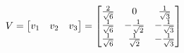 \documentclass[preview]{standalone}
\begin{document}
\begin{align*}
\special{dvisvgm:raw <g id='unique000'>}V = \begin{bmatrix} v_1 & v_2 & v_3 \end{bmatrix} = \begin{bmatrix} \frac{2}{\sqrt{6}} & 0 & \frac{1}{\sqrt{3}} \\ \frac{1}{\sqrt{6}} & -\frac{1}{\sqrt{2}} & -\frac{1}{\sqrt{3}} \\ \frac{1}{\sqrt{6}} & \frac{1}{\sqrt{2}} & -\frac{1}{\sqrt{3}} \end{bmatrix}\special{dvisvgm:raw </g>}
\end{align*}
\end{document}
